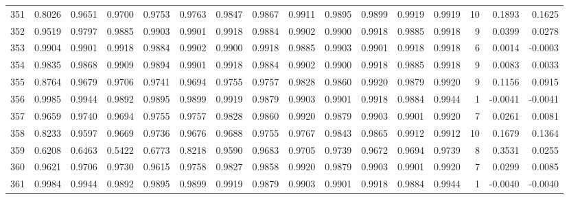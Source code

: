 \begin{tabular}{lrrrrrrrrrrrrrrr}
351 &      0.8026 &  0.9651 &  0.9700 &  0.9753 &  0.9763 &  0.9847 &  0.9867 &  0.9911 &  0.9895 &  0.9899 &   0.9919 &     0.9919 &     10 &                    0.1893 &                     0.1625 \\
352 &      0.9519 &  0.9797 &  0.9885 &  0.9903 &  0.9901 &  0.9918 &  0.9884 &  0.9902 &  0.9900 &  0.9918 &   0.9885 &     0.9918 &      9 &                    0.0399 &                     0.0278 \\
353 &      0.9904 &  0.9901 &  0.9918 &  0.9884 &  0.9902 &  0.9900 &  0.9918 &  0.9885 &  0.9903 &  0.9901 &   0.9918 &     0.9918 &      6 &                    0.0014 &                    -0.0003 \\
354 &      0.9835 &  0.9868 &  0.9909 &  0.9894 &  0.9901 &  0.9918 &  0.9884 &  0.9902 &  0.9900 &  0.9918 &   0.9885 &     0.9918 &      9 &                    0.0083 &                     0.0033 \\
355 &      0.8764 &  0.9679 &  0.9706 &  0.9741 &  0.9694 &  0.9755 &  0.9757 &  0.9828 &  0.9860 &  0.9920 &   0.9879 &     0.9920 &      9 &                    0.1156 &                     0.0915 \\
356 &      0.9985 &  0.9944 &  0.9892 &  0.9895 &  0.9899 &  0.9919 &  0.9879 &  0.9903 &  0.9901 &  0.9918 &   0.9884 &     0.9944 &      1 &                   -0.0041 &                    -0.0041 \\
357 &      0.9659 &  0.9740 &  0.9694 &  0.9755 &  0.9757 &  0.9828 &  0.9860 &  0.9920 &  0.9879 &  0.9903 &   0.9901 &     0.9920 &      7 &                    0.0261 &                     0.0081 \\
358 &      0.8233 &  0.9597 &  0.9669 &  0.9736 &  0.9676 &  0.9688 &  0.9755 &  0.9767 &  0.9843 &  0.9865 &   0.9912 &     0.9912 &     10 &                    0.1679 &                     0.1364 \\
359 &      0.6208 &  0.6463 &  0.5422 &  0.6773 &  0.8218 &  0.9590 &  0.9683 &  0.9705 &  0.9739 &  0.9672 &   0.9694 &     0.9739 &      8 &                    0.3531 &                     0.0255 \\
360 &      0.9621 &  0.9706 &  0.9730 &  0.9615 &  0.9758 &  0.9827 &  0.9858 &  0.9920 &  0.9879 &  0.9903 &   0.9901 &     0.9920 &      7 &                    0.0299 &                     0.0085 \\
361 &      0.9984 &  0.9944 &  0.9892 &  0.9895 &  0.9899 &  0.9919 &  0.9879 &  0.9903 &  0.9901 &  0.9918 &   0.9884 &     0.9944 &      1 &                   -0.0040 &                    -0.0040 \\

\end{tabular}
